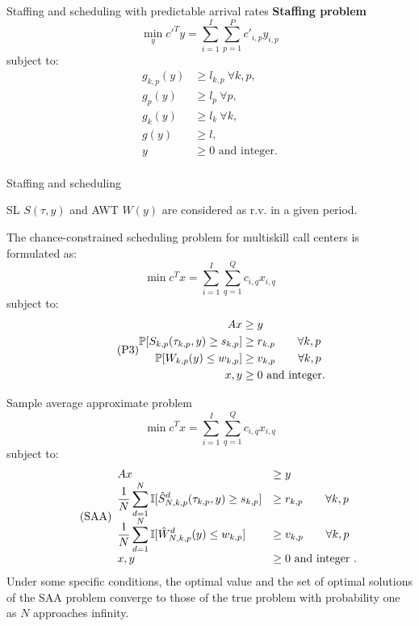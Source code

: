 \documentclass{beamer}
\begin{document}
\begin{frame}{Staffing and scheduling with predictable arrival rates}
	\textbf{Staffing problem}	
	\[
	\min_y {c'}^T y = \sum_{i=1}^I\sum_{p=1}^P c'_{i,p}y_{i,p}
	\]
	subject to:
	\begin{equation} \tag{P2}
		\begin{aligned}
			g_{k,p}({y}) &\geq l_{k,p} ~\forall k,p, \\
			g_{p}({y}) &\geq l_{p} ~\forall p, \\
			g_{k}({y}) &\geq l_{k} ~\forall k, \\
			g(y) &\geq l,\\
			{y}&\geq 0 \text{ and integer}  \text{.}\\
		\end{aligned}
	\end{equation}
\end{frame}

\begin{frame}{Staffing and scheduling}
	
	SL $S(\tau, y)$ and AWT $W(y)$ are considered as r.v. in a given period.
	
	The chance-constrained scheduling problem for multiskill call centers is formulated as:
	\[
	\min {c}^T{x} = \sum_{i=1}^I \sum_{q=1}^Q c_{i,q}x_{i,q}
	\]
	subject to:
	\begin{equation} \tag{P3}
		\begin{aligned}
			{Ax} &\geq {y} \\
			\mathbb{P}[S_{k,p}(\tau_{k,p}, {y}) \geq s_{k,p}] &\geq r_{k,p} \text{\qquad{}}  \forall k,p \\
			\mathbb{P}[W_{k,p}(y) \leq w_{k,p}] &\geq  v_{k,p} \text{\qquad{}} \forall k,p\\
			{x}, {y} &\geq 0 \text{ and integer}. \\
		\end{aligned}
	\end{equation}
\end{frame}


\begin{frame}{Sample average approximate problem}
	\[
	\min {c}^T{x} = \sum_{i=1}^I \sum_{q=1}^Q c_{i,q}x_{i,q}
	\]
	subject to:
	\begin{equation} \tag{SAA} \label{s1}
		\begin{array}{ll}
			{Ax} &\geq {y} \\
			\displaystyle \frac{1}{N} \sum_{d=1}^N\mathbb{I}[\hat{S}_{N, k,p}^d(\tau_{k,p}, {y}) \geq s_{k,p}] &\geq r_{k,p} \text{\qquad{}}\forall k,p\\
			\displaystyle \frac{1}{N}\sum_{d=1}^N\mathbb{I}[\hat{W}_{N,k,p}^d({y}) \leq w_{k,p}]&\geq v_{k,p} \text{\qquad{}}\forall k,p\\
			{x}, {y} &\geq 0 \text{ and integer}  \text{ .}\\
		\end{array}
	\end{equation}
	Under some specific conditions, the optimal value and the set of optimal solutions of the SAA problem converge to those of the true problem  with probability one as $N$ approaches infinity. 
\end{frame}
\end{document}
